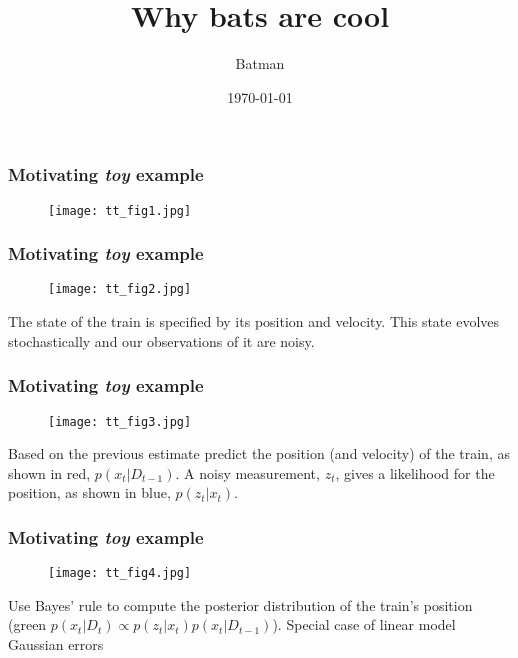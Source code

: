 \documentclass{beamer}
\title{Why bats are cool}
\author{Batman}
\date{\today}
\begin{document}
\frame{\titlepage}

%
%

\frame
{
\frametitle{Motivating \emph{toy} example}
\begin{figure}[htb]
\texttt{[image: tt\_fig1.jpg]}
\end{figure}
}
\frame
{
\frametitle{Motivating \emph{toy} example}
\begin{figure}[htb]
\texttt{[image: tt\_fig2.jpg]}
\end{figure}
The state of the train is specified by its position and velocity.
This state evolves stochastically and our observations of it are noisy.
}
\frame
{
\frametitle{Motivating \emph{toy} example}
\begin{figure}[htb]
\texttt{[image: tt\_fig3.jpg]}
\end{figure}
Based on the previous estimate predict the position (and velocity) of the train, as shown in red, {\color{red} $p(x_t|D_{t-1})$}. 
A noisy measurement, {\color{blue} $z_t$}, gives a likelihood for the position, as shown in blue, {\color{blue} $p(z_t|x_t)$}.
}
\frame
{
\frametitle{Motivating \emph{toy} example}
\begin{figure}[htb]
\texttt{[image: tt\_fig4.jpg]}
\end{figure}
Use Bayes' rule to compute the posterior distribution of the train's position (green {\color[rgb]{0,0.3,0} $p(x_t|D_t)\propto p(z_t|x_t)p(x_t|D_{t-1})$}).
\newline\newline Special case of linear model  Gaussian errors
}
\end{document}

